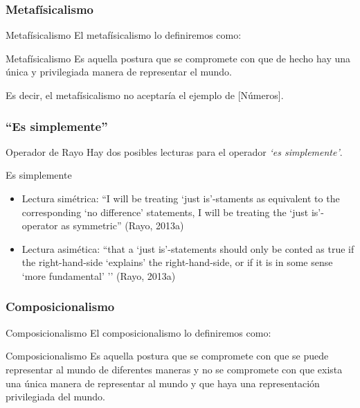 \documentclass{beamer}
\begin{document}
      \subsubsection{Metafísicalismo}
      \begin{frame}{Metafísicalismo}
        El metafísicalismo lo definiremos como: 
        \begin{block}{Metafísicalismo} \pause
            Es aquella postura que se compromete con que de 
            hecho hay una única y privilegiada manera de 
            representar el mundo. \pause
        \end{block}
        Es decir, el metafísicalismo no aceptaría el ejemplo de 
        [Números].
      \end{frame}
      \subsubsection{``Es simplemente''}
      \begin{frame}{Operador de Rayo}
        Hay dos posibles lecturas para el operador \textit{`es simplemente'}.
        \begin{block}{Es simplemente}
            \begin{itemize}
                \item Lectura simétrica: \pause
                ``I will be treating ‘just is’-staments as equivalent to the 
                corresponding ‘no difference’ statements, I will be treating 
                the ‘just is’-operator as symmetric'' (Rayo, 2013a) \pause
                \item Lectura asimética: \pause
                ``that a `just is’-statements should only be conted as true 
                if the right-hand-side `explains’ the right-hand-side, 
                or if it is in some sense `more fundamental’ '' (Rayo, 2013a)
            \end{itemize}
        \end{block}
      \end{frame}
      \subsubsection{Composicionalismo}
      \begin{frame}{Composicionalismo}
        El composicionalismo lo definiremos como: 
        \begin{block}{Composicionalismo} \pause
            Es aquella postura que se compromete con que se 
            puede representar al mundo de diferentes maneras y no 
            se compromete con que exista una única manera de representar 
            al mundo y que haya una representación privilegiada del mundo.
        \end{block}
      \end{frame}
\end{document}

